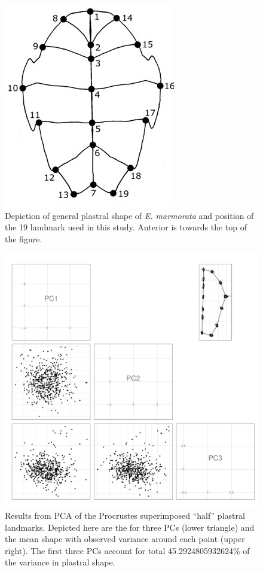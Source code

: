 \documentclass[12pt,letterpaper]{article}\usepackage{graphicx, color}
\begin{document}



\pagebreak

\begin{figure}[ht]
  \centering
  \includegraphics{figure/plastra}
  \caption{Depiction of general plastral shape of \textit{E. marmorata} and position of the 19 landmark used in this study. Anterior is towards the top of the figure.}
  \label{fig:plastra}
\end{figure}

\begin{figure}[ht]
  \centering
  \includegraphics[width = \textwidth]{figure/pca_res}
  \caption{Results from PCA of the Procrustes superimposed ``half'' plastral landmarks. Depicted here are the for three PCs (lower triangle) and the mean shape with observed variance around each point (upper right). The first three PCs account for total 45.2924805932624\% of the variance in plastral shape.}
  \label{fig:pca}
\end{figure}
\end{document}
